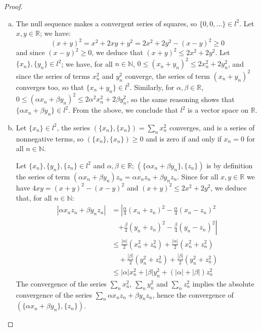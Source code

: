 \documentclass[11pt,a4paper,twoside]{article}
\theoremstyle{definition}
\begin{document}
\begin{proof}\hfill

  \begin{enumerate}[(a)]

  \item The null sequence makes a convergent series of squares, so $\{ 0, 0, \dotsc \} \in l^2$.
    Let $x, y \in \mathbb{R}$; we have:
    \begin{equation*}
      (x + y)^2 = x^2 + 2 x y + y^2 = 2 x^2 + 2 y^2 - (x - y)^2 \geq 0
    \end{equation*}
    and since $(x - y)^2 \geq 0$, we deduce that $(x + y)^2 \leq 2 x^2 + 2 y^2$.
    Let $\{ x_n \}, \{ y_n \} \in l^2$; we have, for all $n \in \mathbb{N}$, $0 \leq (x_n + y_n)^2 \leq 2 x_n^2 + 2 y_n^2$,
    and since the series of terms $x_n^2$ and $y_n^2$ converge, the series of term $(x_n + y_n)^2$ converges too, so that $\{ x_n + y_n \} \in l^2$.
    Similarly, for $\alpha, \beta \in \mathbb{R}$, $0 \leq (\alpha x_n + \beta y_n)^2 \leq 2 \alpha^2 x_n^2 + 2 \beta y_n^2$,
    so the same reasoning shows that $\{ \alpha x_n + \beta y_n \} \in l^2$.
    From the above, we conclude that $l^2$ is a vector space on $\mathbb{R}$.

  \item Let $\{ x_n \} \in l^2$, the series $( \{ x_n \}, \{ x_n \} ) = \sum_n x_n^2$ converges, and is a series of nonnegative terms,
    so $( \{ x_n \}, \{ x_n \} ) \geq 0$ and is zero if and only if $x_n = 0$ for all $n \in \mathbb{N}$.

    Let $\{ x_n \}, \{ y_n \}, \{ z_n \} \in l^2$ and $\alpha, \beta \in \mathbb{R}$; $(\{ \alpha x_n + \beta y_n \}, \{ z_n \})$ is by definition the series
    of term $(\alpha x_n + \beta y_n) z_n = \alpha x_n z_n + \beta y_n z_n$.
    Since for all $x, y \in \mathbb{R}$ we have $4 x y = (x + y)^2 - (x - y)^2$ and $(x + y)^2 \leq 2 x^2 + 2 y^2$, we deduce that, for all $n \in \mathbb{N}$:
    \begin{align*}
      | \alpha x_n z_n + \beta y_n z_n | &= \left| \frac{\alpha}{4} (x_n + z_n)^2 - \frac{\alpha}{4} (x_n - z_n)^2 \right. \\
      &\quad \left. + \frac{\beta}{4} (y_n + z_n)^2 - \frac{\beta}{4} (y_n - z_n)^2 \right| \\
      &\leq \frac{| \alpha |}{2} (x_n^2 + z_n^2) + \frac{| \alpha |}{2} (x_n^2 + z_n^2) \\
      &\quad + \frac{| \beta |}{2} (y_n^2 + z_n^2) + \frac{| \beta |}{2} (y_n^2 + z_n^2) \\
      &\leq | \alpha | x_n^2 + | \beta | y_n^2 + \left( | \alpha | + | \beta | \right) z_n^2
    \end{align*}
    The convergence of the series $\sum_n x_n^2$, $\sum_n y_n^2$ and $\sum_n z_n^2$ implies the absolute convergence of the series $\sum_n \alpha x_n z_n + \beta y_n z_n$,
    hence the convergence of $(\{ \alpha x_n + \beta y_n \}, \{ z_n \})$.


\end{enumerate}
\end{proof}
\end{document}
